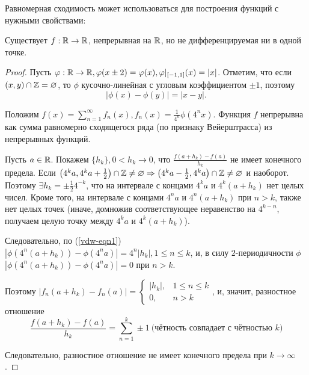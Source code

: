 Равномерная сходимость может использоваться для построения функций с нужными свойствами:
\begin{example}
    Существует $f : \mathbb{R} \rightarrow \mathbb{R}$, непрерывная на $\mathbb{R}$, но не дифференцируемая ни в одной точке.

    \begin{proof}
        Пусть $\varphi: \mathbb{R} \rightarrow \mathbb{R}, \varphi(x \pm 2) = \varphi(x), \varphi|_{[-1, 1]}(x) = |x|$. Отметим, что если $(x, y) \cap \mathbb{Z} = \varnothing$, то $\phi$ кусочно-линейная с угловым коэффициентом $\pm 1$, поэтому
        \begin{equation}
            \label{vdw-eqn1}
            |\phi(x) - \phi(y)| = |x - y|.
        \end{equation}

        Положим $f(x) = \sum_{n = 1}^\infty f_n(x), f_n(x) = \frac{1}{4^n} \phi(4^n x)$. Функция $f$ непрерывна как сумма равномерно сходящегося ряда (по признаку Вейерштрасса) из непрерывных функций.

        Пусть $a \in \mathbb{R}$. Покажем $\{h_k\}, 0 < h_k \rightarrow 0$, что $\frac{f(a + h_k) - f(a)}{h_k}$ не имеет конечного предела. Если $\left(4^k a, 4^k a + \frac{1}{2}\right) \cap \mathbb{Z} \neq \varnothing \Rightarrow \left(4^k a - \frac{1}{2}, 4^k a\right) \cap \mathbb{Z} \neq \varnothing$ и наоборот. Поэтому $\exists h_k = \pm \frac{1}{2} 4^{-k}$, что на интервале с концами $4^k a$ и $4^k (a + h_k)$ нет целых чисел. Кроме того, на интервале с концами $4^n a$ и $4^n (a + h_k)$ при $n > k$, также нет целых точек (иначе, домножив соответствующее неравенство на $4^{k - n}$, получаем целую точку между $4^k a$ и $4^k (a + h_k)$).

        Следовательно, по (\ref{vdw-eqn1}) $|\phi(4^n (a + h_k)) - \phi(4^n a)| = 4^n |h_k|, 1 \le n \le k$, и, в силу $2$-периодичности $\phi$ $|\phi(4^n (a + h_k)) - \phi(4^n a)| = 0$ при $n > k$.

        Поэтому $|f_n(a + h_k) - f_n(a)| = \left\{\begin{array}{lc} |h_k|, & 1 \le n \le k \\ 0, & n > k\end{array}\right.$, и, значит, разностное отношение
        \[
            \frac{f(a + h_k) - f(a)}{h_k} = \sum_{n = 1}^k \pm 1 \ \text{(чётность совпадает с чётностью $k$)}
        \]

        Следовательно, разностное отношение не имеет конечного предела при $k \rightarrow \infty$.
    \end{proof}
\end{example}

